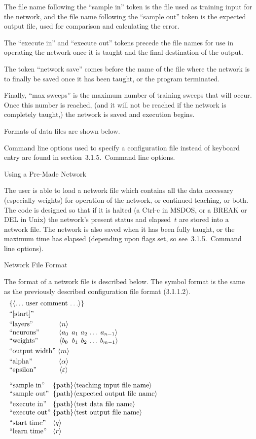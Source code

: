 The file name following the ``sample in'' token is the file used as
training input for the network, and the file name following the
``sample out'' token is the expected output file, used for
comparison and calculating the error.

The ``execute in'' and ``execute out'' tokens precede the file names
for use in operating the network once it is taught and the
final destination of the output.

The token ``network save'' comes before the name of the file where
the network is to finally be saved once it has been taught, or the
program terminated.

Finally, ``max sweeps'' is the maximum number of training sweeps
that will occur.
Once this number is reached, (and it will not be reached if the
network is completely taught,) the network is saved and
execution begins.

Formats of data files are shown below.

Command line options used to specify a configuration file instead of
keyboard entry are found in section~3.1.5.\ Command line options.

\ssec Using a Pre-Made Network

The user is able to load a network file which contains all the data
necessary (especially weights) for operation of
the network, or continued teaching, or both.
The code is designed so that if it is halted (a Ctrl-c in MSDOS, or a
BREAK or DEL in Unix) the network's present status and elapsed~$t$ are
stored into a network file.
The network is also saved when it has been fully taught, or the
maximum time has elapsed (depending upon flags set, so see~3.1.5.\
Command line options).

\sssec Network File Format

The format of a network file is described below.
The symbol format is the same as the previously described
configuration file format (3.1.1.2).
$$\vbox{
\halign{#\hfil&&\ \hfil#\hfil\cr
	\noalign{\noindent$\{\langle \ldots$ user comment $\ldots \rangle\}$}
	\noalign{\smallskip}
	``[start]''\cr
	\noalign{\smallskip}
	``layers''&$\langle n\rangle$\cr
	``neurons''&$\langle a_0$&$a_1$&$a_2$&$\ldots$&$a_{n-1}\rangle$\cr
	``weights''&$\langle b_0$&$b_1$&$b_2$&$\ldots$&$b_{m-1}\rangle$\cr
	\noalign{\smallskip}
	``output width''&$\langle m\rangle$\cr
	\noalign{\smallskip}
	``alpha''&$\langle\alpha\rangle$\cr
	``epsilon''&$\langle\varepsilon\rangle$\cr
}}
$$
$$\vbox{
\halign{#\hfil&\ #\hfill\cr
	\noalign{$\quad$}
	``sample in''&$\{$path$\}\langle$teaching input file name$\rangle$\cr
	``sample out''&$\{$path$\}\langle$expected output file name$\rangle$\cr
	\noalign{\smallskip}
	``execute in''&$\{$path$\}\langle$test data file name$\rangle$\cr
	``execute out''&$\{$path$\}\langle$test output file name$\rangle$\cr
	\noalign{\smallskip}
	``start time''&$\langle q\rangle$\cr
	``learn time''&$\langle r\rangle$\cr
}}
$$

